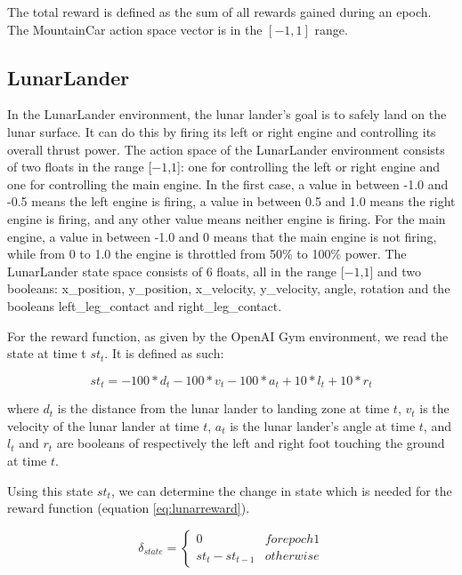 The total reward is defined as the sum of all rewards gained during an epoch. The MountainCar action space vector is in the $[-1,1]$ range. 

\subsection{LunarLander}
In the LunarLander environment, the lunar lander's goal is to safely land on the lunar surface. It can do this by firing its left or right engine and controlling its overall thrust power. The action space of the LunarLander environment consists of two floats in the range [$-1$,$1$]: one for controlling the left or right engine and one for controlling the main engine. In the first case, a value in between -1.0 and -0.5 means the left engine is firing, a value in between 0.5 and 1.0 means the right engine is firing, and any other value means neither engine is firing. For the main engine, a value in between -1.0 and 0 means that the main engine is not firing, while from 0 to 1.0 the engine is throttled from 50\% to 100\% power. The LunarLander state space consists of 6 floats, all in the range [$-1$,$1$] and two booleans: x\_position, y\_position, x\_velocity, y\_velocity, angle, rotation and the booleans left\_leg\_contact and right\_leg\_contact.  

For the reward function, as given by the OpenAI Gym environment, we read the state at time t $st_t$. It is defined as such:

\begin{equation} 
    st_t = -100 * d_t - 100 * v_t - 100 * a_t + 10*l_t + 10*r_t
\end{equation}

where $d_t$ is the distance from the lunar lander to landing zone at time $t$, $v_t$ is the velocity of the lunar lander at time $t$, $a_t$ is the lunar lander's angle at time $t$, and $l_t$ and $r_t$ are booleans of respectively the left and right foot touching the ground at time $t$.  

Using this state $st_t$, we can determine the change in state which is needed for the reward function (equation \ref{eq:lunarreward}). 

\begin{equation}
    \delta _{state} =
    \begin{cases*}
      0  & for epoch 1 \\
      st_t - st _{t-1} & otherwise 
    \end{cases*}
\end{equation}

